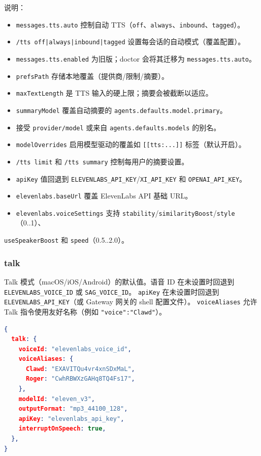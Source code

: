 说明：

\begin{itemize}
  \item \texttt{messages.tts.auto} 控制自动 TTS（\texttt{off}、\texttt{always}、\texttt{inbound}、\texttt{tagged}）。
  \item \texttt{/tts off|always|inbound|tagged} 设置每会话的自动模式（覆盖配置）。
  \item \texttt{messages.tts.enabled} 为旧版；doctor 会将其迁移为 \texttt{messages.tts.auto}。
  \item \texttt{prefsPath} 存储本地覆盖（提供商/限制/摘要）。
  \item \texttt{maxTextLength} 是 TTS 输入的硬上限；摘要会被截断以适应。
  \item \texttt{summaryModel} 覆盖自动摘要的 \texttt{agents.defaults.model.primary}。
  \item 接受 \texttt{provider/model} 或来自 \texttt{agents.defaults.models} 的别名。
  \item \texttt{modelOverrides} 启用模型驱动的覆盖如 \texttt{[[tts:...]]} 标签（默认开启）。
  \item \texttt{/tts limit} 和 \texttt{/tts summary} 控制每用户的摘要设置。
  \item \texttt{apiKey} 值回退到 \texttt{ELEVENLABS\_API\_KEY}/\texttt{XI\_API\_KEY} 和 \texttt{OPENAI\_API\_KEY}。
  \item \texttt{elevenlabs.baseUrl} 覆盖 ElevenLabs API 基础 URL。
  \item \texttt{elevenlabs.voiceSettings} 支持 \texttt{stability}/\texttt{similarityBoost}/\texttt{style}（0..1）、
\end{itemize}

\texttt{useSpeakerBoost} 和 \texttt{speed}（0.5..2.0）。

\subsubsection{talk}


Talk 模式（macOS/iOS/Android）的默认值。语音 ID 在未设置时回退到 \texttt{ELEVENLABS\_VOICE\_ID} 或 \texttt{SAG\_VOICE\_ID}。
\texttt{apiKey} 在未设置时回退到 \texttt{ELEVENLABS\_API\_KEY}（或 Gateway 网关的 shell 配置文件）。
\texttt{voiceAliases} 允许 Talk 指令使用友好名称（例如 \texttt{"voice":"Clawd"}）。

\begin{lstlisting}[language=json]
{
  talk: {
    voiceId: "elevenlabs_voice_id",
    voiceAliases: {
      Clawd: "EXAVITQu4vr4xnSDxMaL",
      Roger: "CwhRBWXzGAHq8TQ4Fs17",
    },
    modelId: "eleven_v3",
    outputFormat: "mp3_44100_128",
    apiKey: "elevenlabs_api_key",
    interruptOnSpeech: true,
  },
}
\end{lstlisting}


